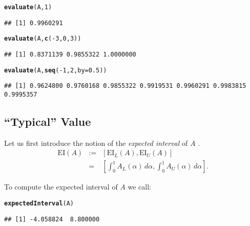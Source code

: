 \documentclass[11pt]{article}\usepackage{graphicx, color}
\makeatletter
\newcommand{\hlfunctioncall}[1]{\textcolor[rgb]{0.501960784313725,0,0.329411764705882}{\textbf{#1}}}%
\newenvironment{kframe}{%
 \def\at@end@of@kframe{}%
 \ifinner\ifhmode%
  \def\at@end@of@kframe{\end{minipage}}%
  \begin{minipage}{\columnwidth}%
 \fi\fi%
 \def\FrameCommand##1{\hskip\@totalleftmargin \hskip-\fboxsep
 \colorbox{shadecolor}{##1}\hskip-\fboxsep
     \hskip-\linewidth \hskip-\@totalleftmargin \hskip\columnwidth}%
 \MakeFramed {\advance\hsize-\width
   \@totalleftmargin\z@ \linewidth\hsize
   \@setminipage}}%
 {\par\unskip\endMakeFramed%
 \at@end@of@kframe}
\newenvironment{knitrout}{}{} %
\makeatother
\begin{document}
\begin{knitrout}\small
{}\color{fgcolor}\begin{kframe}
\begin{alltt}
\hlfunctioncall{evaluate}(A, 1)
\end{alltt}
\begin{verbatim}
## [1] 0.9960291
\end{verbatim}
\begin{alltt}
\hlfunctioncall{evaluate}(A, \hlfunctioncall{c}(-3,0,3))
\end{alltt}
\begin{verbatim}
## [1] 0.8371139 0.9855322 1.0000000
\end{verbatim}
\begin{alltt}
\hlfunctioncall{evaluate}(A, \hlfunctioncall{seq}(-1, 2, by=0.5))
\end{alltt}
\begin{verbatim}
## [1] 0.9624800 0.9760168 0.9855322 0.9919531 0.9960291 0.9983815 0.9995357
\end{verbatim}
\end{kframe}
\end{knitrout}




\subsection{``Typical'' Value}


Let us first introduce the notion of the \textit{expected interval} of $A$
\cite{DuboisPrade1987:meanfn}.
\begin{eqnarray}
\mathrm{EI}(A) & := & [\mathrm{EI}_L(A), \mathrm{EI}_U(A)] \\
               & = & \left[ \int_0^1 A_L(\alpha)\,d\alpha, \int_0^1 A_U(\alpha)\,d\alpha \right].
\end{eqnarray}

\noindent
To compute the expected interval of $A$ we call:

\begin{knitrout}\small
{}\color{fgcolor}\begin{kframe}
\begin{alltt}
\hlfunctioncall{expectedInterval}(A)
\end{alltt}
\begin{verbatim}
## [1] -4.058824  8.800000
\end{verbatim}
\end{kframe}
\end{knitrout}
\end{document}
